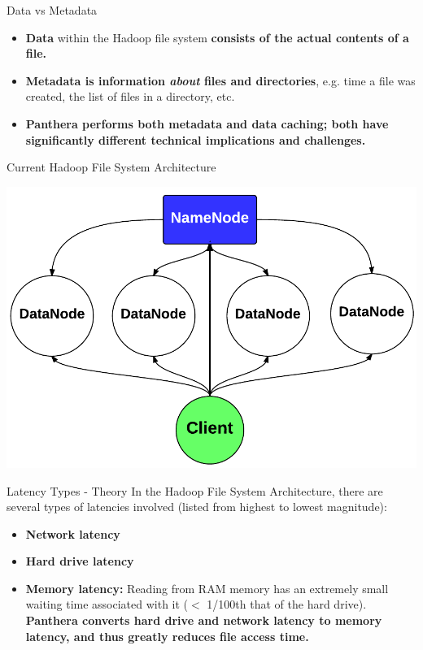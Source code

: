 \documentclass[final]{beamer} %
\begin{document}
\begin{frame}
\begin{columns}[t]
\begin{column}{0.32\textwidth}
		\begin{block}{Data vs Metadata}
			\begin{itemize}
				\item \textbf{Data} within the Hadoop file system \textbf{consists of the actual contents of a file.}
				\item \textbf{Metadata is information \textit{about} files and directories}, e.g. time a file was created, the list of files in a directory, etc.
				\item \textbf{Panthera performs both metadata
			and data caching; both have significantly different technical implications
			and challenges.}
			\end{itemize}
		\end{block}
	
		\begin{block}{Current Hadoop File System Architecture}
			\centerline{\includegraphics[scale=1.4]{assets/v2/vanilla_hadoop_arch.pdf}}
		\end{block}
	
		\begin{block}{Latency Types - Theory}
		In the Hadoop File System Architecture, there are several types of latencies involved (listed from highest to lowest magnitude):
		\begin{itemize}
		\item \textbf{Network latency}
		\item \textbf{Hard drive latency}
		\item \textbf{Memory latency: } Reading from RAM memory has an extremely small
		waiting time associated with it ($<$ 1/100th that of the hard drive). \textbf{Panthera converts hard drive and network latency to memory latency, and thus greatly reduces file access time.}
		\end{itemize}
	  	\end{block}
	  


\end{column}
\end{columns}
\end{frame}
\end{document}

